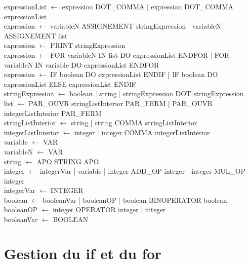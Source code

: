 ﻿\documentclass{report}
\begin{document}
expressionList $\leftarrow$ expression DOT\_COMMA | expression DOT\_COMMA expressionList\\

expression $\leftarrow$ variableN ASSIGNEMENT stringExpression | variableN ASSIGNEMENT list\\

expression $\leftarrow$ PRINT stringExpression\\

expression $\leftarrow$ FOR variableN IN list DO expressionList ENDFOR | FOR variableN IN variable DO expressionList ENDFOR\\

expression $\leftarrow$ IF boolean DO expressionList ENDIF | IF boolean DO expressionList ELSE expressionList ENDIF\\

stringExpression $\leftarrow$ boolean | string | stringExpression DOT stringExpression\\

list $\leftarrow$ PAR\_OUVR stringListInterior PAR\_FERM | PAR\_OUVR integerListInterior PAR\_FERM\\

stringListInterior $\leftarrow$ string | string COMMA stringListInterior\\

integerListInterior $\leftarrow$ integer | integer COMMA integerListInterior\\

variable $\leftarrow$ VAR\\

variableN $\leftarrow$ VAR\\

string $\leftarrow$ APO STRING APO\\

integer $\leftarrow$ integerVar | variable | integer ADD\_OP integer | integer MUL\_OP integer\\

integerVar $\leftarrow$ INTEGER\\

boolean $\leftarrow$ booleanVar | booleanOP | boolean BINOPERATOR boolean\\

booleanOP $\leftarrow$ integer OPERATOR integer | integer\\

booleanVar $\leftarrow$ BOOLEAN\\


\section*{ Gestion du if et du for}
\end{document}
